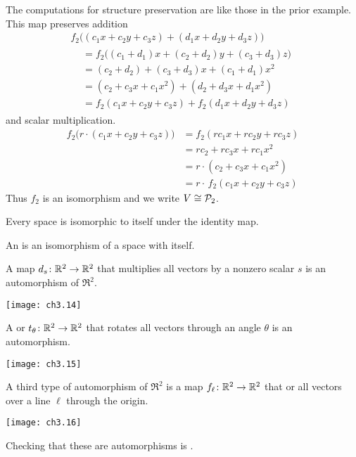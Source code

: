 \begin{example}
The computations for structure preservation are like those 
in the prior example.
This map preserves addition
\begin{multline*}
  f_2\bigl((c_1x+c_2y+c_3z)
        +(d_1x+d_2y+d_3z)\bigr)       \\
 \begin{aligned}
  &=f_2\bigl((c_1+d_1)x+(c_2+d_2)y+(c_3+d_3)z\bigr)   \\
  &=(c_2+d_2)+(c_3+d_3)x+(c_1+d_1)x^2   \\
  &=(c_2+c_3x+c_1x^2)+(d_2+d_3x+d_1x^2)   \\
  &=f_2(c_1x+c_2y+c_3z)+f_2(d_1x+d_2y+d_3z)
 \end{aligned}
\end{multline*}
and scalar multiplication.
\begin{align*}
  f_2\bigl(r\cdot(c_1x+c_2y+c_3z)\bigr)
  &=f_2(rc_1x+rc_2y+rc_3z)   \\
  &=rc_2+rc_3x+rc_1x^2   \\
  &=r\cdot(c_2+c_3x+c_1x^2)   \\
  &=r\cdot\, f_2(c_1x+c_2y+c_3z)
\end{align*}
Thus $f_2$ is an isomorphism and we write $V\cong\mathcal{P}_2$.
\end{example}

Every space is isomorphic to itself under the identity map.

\begin{definition}
An %
is an isomorphism of a space with 
itself.
\end{definition}

\begin{example} \label{exam:RigidPlaneMapsAutos}
A 
map $\mbox{$d_s\colon \mathbb{R}^2\to \mathbb{R}^2$}$ that multiplies all vectors by a nonzero
scalar $s$ is an automorphism of $\Re^2$.
\begin{center} \small
  \texttt{[image: ch3.14]}                                
\end{center}
A %
or  $\mbox{$t_{\theta}\colon \mathbb{R}^2\to \mathbb{R}^2$}$
that rotates all vectors through an angle $\theta$ is an automorphism.
\begin{center} \small
  \texttt{[image: ch3.15]}                                
\end{center}
A third type of automorphism of $\Re^2$ is a map 
$\mbox{$f_\ell\colon \mathbb{R}^2\to \mathbb{R}^2$}$ that 
or %
all vectors over a line $\ell$ through the origin.
\begin{center} \small
  \texttt{[image: ch3.16]}                                
\end{center}
Checking that these are automorphisms is 
.
\end{example}

